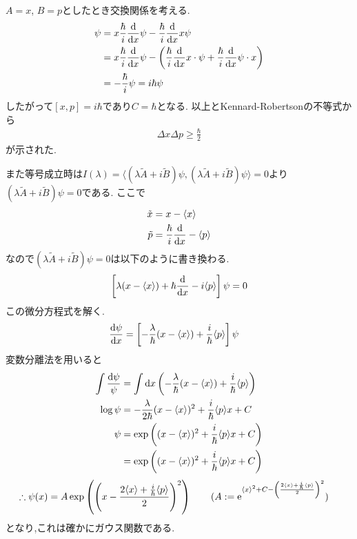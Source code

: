 \documentclass[uplatex,a4j,11pt]{jsarticle}
\def\product<#1>{\langle #1 \rangle}
\begin{document}
\subsubsection{}
$A=x$, $B=p$としたとき交換関係を考える.
\begin{align*}
  [x,p]\psi&=x\frac{\hbar}{i}\frac{\rm d}{{\rm d}x}\psi-\frac{\hbar}{i}\frac{\rm d}{{\rm d}x}x\psi\\
  &=x\frac{\hbar}{i}\frac{\rm d}{{\rm d}x}\psi-\left(\frac{\hbar}{i}\frac{\rm d}{{\rm d}x}x\cdot\psi+\frac{\hbar}{i}\frac{\rm d}{{\rm d}x}\psi\cdot x\right)\\
  &=-\frac{\hbar}{i}\psi=i\hbar\psi
\end{align*}
したがって$[x,p]=i\hbar$であり$C=\hbar$となる.
以上とKennard-Robertsonの不等式から
\begin{align*}
  \Delta x\Delta p\geq\frac{\hbar}{2}
\end{align*}
が示された.

また等号成立時は$I(\lambda)=\product<(\lambda\tilde{A}+i\tilde{B})\psi,(\lambda\tilde{A}+i\tilde{B})\psi>=0$より$(\lambda\tilde{A}+i\tilde{B})\psi=0$である.
ここで
\begin{align*}
  \tilde{x}&=x-\product<x>\\
  \tilde{p}&=\frac{\hbar}{i}\frac{\rm d}{{\rm d}x}-\product<p>\\
\end{align*}
なので$(\lambda\tilde{A}+i\tilde{B})\psi=0$は以下のように書き換わる.
\begin{align*}
  \left[\lambda(x-\product<x>)+\hbar\frac{\rm d}{{\rm d}x}-i\product<p>\right]\psi=0
\end{align*}
この微分方程式を解く.
\begin{align*}
  \frac{{\rm d}\psi}{{\rm d}x}&=\left[-\frac{\lambda}{\hbar}(x-\product<x>)+\frac{i}{\hbar}\product<p>\right]\psi
\end{align*}
変数分離法を用いると
\begin{align*}
  \int\frac{{\rm d}\psi}{\psi}&=\int{\rm d}x\left(-\frac{\lambda}{\hbar}(x-\product<x>)+\frac{i}{\hbar}\product<p>\right)\\
  \log\psi&=-\frac{\lambda}{2\hbar}(x-\product<x>)^2+\frac{i}{\hbar}\product<p>x+C\\
  \psi&=\exp\left((x-\product<x>)^2+\frac{i}{\hbar}\product<p>x+C\right)\\
  &=\exp\left((x-\product<x>)^2+\frac{i}{\hbar}\product<p>x+C\right)\\
\end{align*}
\begin{align*}
  \therefore\psi(x)&=A\exp\left(\left(x-\frac{2\product<x>+\frac{i}{\hbar}\product<p>}{2}\right)^2\right)\qquad
  (A:={\rm e}^{\product<x>^2+C-\left(\frac{2\product<x>+\frac{i}{\hbar}\product<p>}{2}\right)^2})
\end{align*}
となり,これは確かにガウス関数である.
\end{document}
